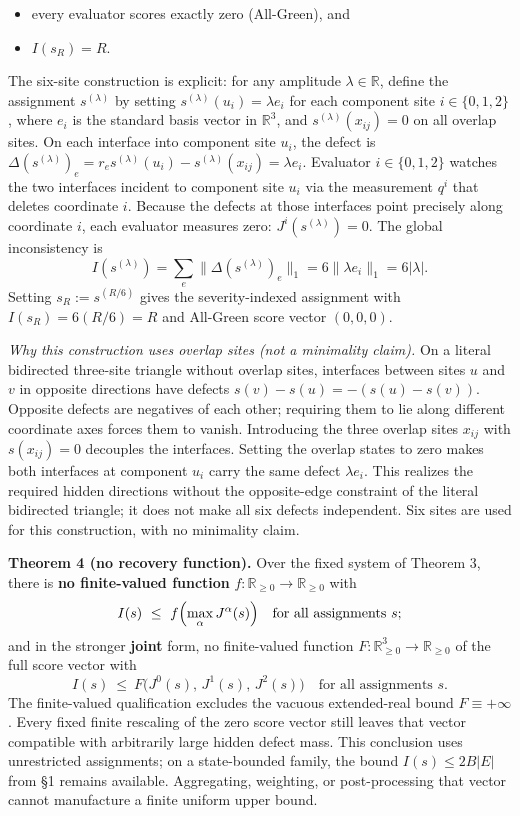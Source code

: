 \documentclass[
  11pt,
]{article}
\providecommand{\tightlist}{%
  \setlength{\itemsep}{0pt}\setlength{\parskip}{0pt}}
\theoremstyle{plain}
\theoremstyle{definition}\newtheorem{definition}[theorem]{Definition}
\theoremstyle{remark}\newtheorem*{remark}{Remark}
\begin{document}
\begin{itemize}
\tightlist
\item
  every evaluator scores exactly zero (All-Green), and
\item
  \(I(s_R) = R\).
\end{itemize}

The six-site construction is explicit: for any amplitude
\(\lambda \in \mathbb R\), define the assignment \(s^{(\lambda)}\) by
setting \(s^{(\lambda)}(u_i) = \lambda e_i\) for each component site
\(i \in \{0, 1, 2\}\), where \(e_i\) is the standard basis vector in
\(\mathbb R^3\), and \(s^{(\lambda)}(x_{ij}) = 0\) on all overlap sites.
On each interface into component site \(u_i\), the defect is
\(\Delta(s^{(\lambda)})_e = r_e s^{(\lambda)}(u_i) - s^{(\lambda)}(x_{ij}) = \lambda e_i\).
Evaluator \(i \in \{0, 1, 2\}\) watches the two interfaces incident to
component site \(u_i\) via the measurement \(q^i\) that deletes
coordinate \(i\). Because the defects at those interfaces point
precisely along coordinate \(i\), each evaluator measures zero:
\(J^i(s^{(\lambda)}) = 0\). The global inconsistency is
\[I(s^{(\lambda)}) = \sum_{e} \lVert\Delta(s^{(\lambda)})_e\rVert_1 = 6 \lVert\lambda e_i\rVert_1 = 6 |\lambda|.\]
Setting \(s_R := s^{(R/6)}\) gives the severity-indexed assignment with
\(I(s_R) = 6(R/6) = R\) and All-Green score vector \((0, 0, 0)\).

\emph{Why this construction uses overlap sites (not a minimality
claim).} On a literal bidirected three-site triangle without overlap
sites, interfaces between sites \(u\) and \(v\) in opposite directions
have defects \(s(v) - s(u) = -(s(u) - s(v))\). Opposite defects are
negatives of each other; requiring them to lie along different
coordinate axes forces them to vanish. Introducing the three overlap
sites \(x_{ij}\) with \(s(x_{ij}) = 0\) decouples the interfaces.
Setting the overlap states to zero makes both interfaces at component
\(u_i\) carry the same defect \(\lambda e_i\). This realizes the
required hidden directions without the opposite-edge constraint of the
literal bidirected triangle; it does not make all six defects
independent. Six sites are used for this construction, with no
minimality claim.

\textbf{Theorem 4 (no recovery function).} Over the fixed system of
Theorem 3, there is \textbf{no finite-valued function}
\(f : \mathbb{R}_{\ge 0} \to \mathbb{R}_{\ge 0}\) with
\[I(s)\ \le\ f\Bigl(\max_\alpha J^\alpha(s)\Bigr)\quad\text{for all assignments }s ;\]
and in the stronger \textbf{joint} form, no finite-valued function
\(F : \mathbb{R}_{\ge 0}^3 \to \mathbb{R}_{\ge 0}\) of the full score
vector with
\[I(s)\ \le\ F\bigl(J^0(s),\,J^1(s),\,J^2(s)\bigr)\quad\text{for all assignments }s .\]
The finite-valued qualification excludes the vacuous extended-real bound
\(F\equiv+\infty\). Every fixed finite rescaling of the zero score
vector still leaves that vector compatible with arbitrarily large hidden
defect mass. This conclusion uses unrestricted assignments; on a
state-bounded family, the bound \(I(s)\le 2B|E|\) from §1 remains
available. Aggregating, weighting, or post-processing that vector cannot
manufacture a finite uniform upper bound.
\end{document}
